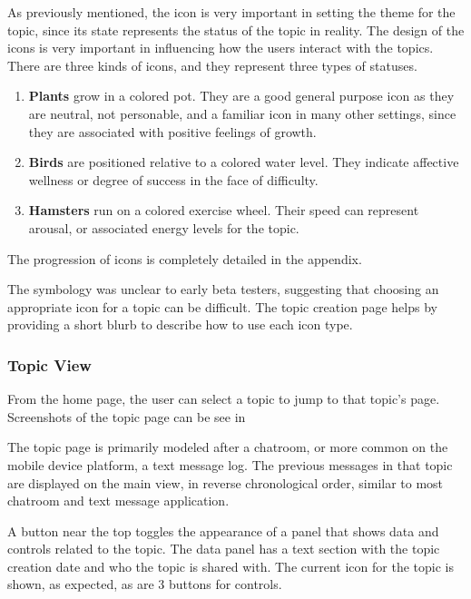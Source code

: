       As previously mentioned, the icon is very important in setting
      the theme for the topic, since its state represents the status of the topic
      in reality.
      The design of the icons is very important in influencing how
      the users interact with the topics. 
      There are three kinds of icons, and they represent three types of statuses.
      \begin{enumerate}
      \item \textbf{Plants} grow in a colored pot. They are a good general purpose icon as they are neutral,
      not personable, and a familiar icon in many other settings,
      since they are associated with positive feelings of growth.
      \item \textbf{Birds} are positioned relative to a colored water level.
      They indicate affective wellness or degree of success in the face of difficulty.
      \item \textbf{Hamsters} run on a colored exercise wheel.
      Their speed can represent arousal,
      or associated energy levels for the topic.
      \end{enumerate}
      The progression of icons is completely detailed in the appendix.

      The symbology was unclear to early beta testers,
      suggesting that choosing an appropriate icon for a topic can be difficult.
      The topic creation page helps by providing
      a short blurb to describe how to use each icon type.

      \subsubsection{Topic View}
      From the home page,
      the user can select a topic to jump to that topic's page.
      Screenshots of the topic page can be see in \cite{}

      The topic page is primarily modeled after a chatroom,
      or more common on the mobile device platform,
      a text message log.
      The previous messages in that topic are displayed on the main view,
      in reverse chronological order, similar to most chatroom and text message application.

      A button near the top toggles the appearance of a panel that shows data and controls
      related to the topic.
      The data panel has a text section with the topic creation date and who the topic is shared with.
      The current icon for the topic is shown, as expected, as are 3 buttons for controls.

